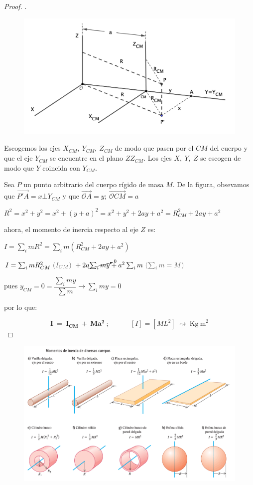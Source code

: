 \begin{proof}.
\begin{figure}[H]
	\centering
	\includegraphics[width=1\textwidth]{imagenes/imagenes16/T16IM05.png}
\end{figure}
Escogemos los ejes $X_{CM},\ Y_{CM},\ Z_{CM}$ de modo que pasen por el $CM$ del cuerpo y que el eje $Y_{CM}$ se encuentre en el plano $ZZ_{CM}$. Los ejes $X,\ Y,\ Z$ se escogen de modo que $Y$ coincida con $Y_{CM}$. 

Sea $P$ un punto arbitrario del cuerpo rígido de masa $M$. De la figura, obsevamos que $\overrightarrow{P'A}=x\bot Y_{CM}$ y que $\overrightarrow{\mathcal OA}=y;\ \overrightarrow{\mathcal OCM}=a$

$R^2=x^2+y^2=x^2+(y+a)^2=x^2+y^2+2ay+a^2=R^2_{CM}+2ay+a^2$

ahora, el momento de inercia respecto al eje $Z$ es:

$I=\sum_i mR^2=\sum_i m(R^2_{CM} +2ay+a^2)$

$I=\sum_i mR^2_{CM} \ \textcolor{gris}{(I_{CM})}\ +2a\cancelto{0}{\sum_i my} + a^2\sum_i m \ \textcolor{gris}{ (\sum_i m=M) } \ $

pues $y_{CM}=0=\dfrac{\sum_i my}{\sum m} \to \sum_i my=0$

por lo que:

$$ \boldsymbol{ I \ = \ I_{CM} \ + \ M a^2 }\ ; \quad  \qquad [I]=[ML^2] \ \rightsquigarrow  \ \mathrm{Kg\ m}^2$$
\end{proof}


\begin{figure}[H]
	\centering
	\includegraphics[width=1.1\textwidth]{imagenes/imagenes16/T16IM06.png}
\end{figure}



